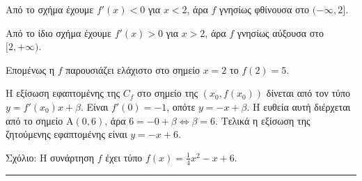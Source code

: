 \begin{alist}
    \item Από το σχήμα έχουμε $f'(x)<0$ για $x<2$, άρα $f$ γνησίως φθίνουσα στο $(-\infty, 2]$.
    
    \item Από το ίδιο σχήμα έχουμε $f'(x)>0$ για $x>2$, άρα $f$ γνησίως αύξουσα στο $[2, +\infty)$.
    
    Επομένως η $f$ παρουσιάζει ελάχιστο στο σημείο $x=2$ το $f(2)=5$.
    
    \item Η εξίσωση εφαπτομένης της $C_{f}$ στο σημείο της $(x_{0}, f(x_{0}))$ δίνεται από τον τύπο $y=f'(x_{0})x+\beta$. Είναι $f'(0)=-1$, οπότε $y=-x+\beta$. Η ευθεία αυτή διέρχεται από το σημείο $\mathrm{A}(0, 6)$, άρα $6=-0+\beta \Leftrightarrow \beta=6$. Τελικά η εξίσωση της ζητούμενης εφαπτομένης είναι $y=-x+6$.
\end{alist}

Σχόλιο: Η συνάρτηση $f$ έχει τύπο $f(x)=\frac{1}{4}x^{2}-x+6$.
\vspace{6mm}
\noindent\rule{\textwidth}{0.4pt}
\vspace{6mm}

